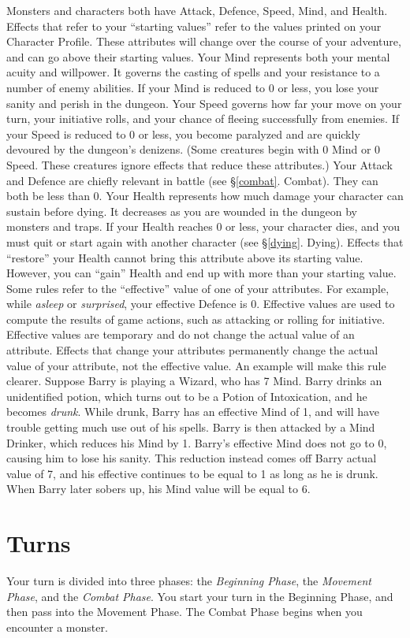 \documentclass{book}
\begin{document}
Monsters and characters both have Attack, Defence, Speed, Mind, and Health. Effects that refer to your “starting values” refer to the values printed on your Character Profile. These attributes will change over the course of your adventure, and can go above their starting values.
Your Mind represents both your mental acuity and willpower. It governs the casting of spells and your resistance to a number of enemy abilities. If your Mind is reduced to 0 or less, you lose your sanity and perish in the dungeon.
Your Speed governs how far your move on your turn, your initiative rolls, and your chance of fleeing successfully from enemies. If your Speed is reduced to 0 or less, you become paralyzed and are quickly devoured by the dungeon’s denizens. (Some creatures begin with 0 Mind or 0 Speed. These creatures ignore effects that reduce these attributes.)
Your Attack and Defence are chiefly relevant in battle (see §\ref{combat}. Combat). They can both be less than 0.
Your Health represents how much damage your character can sustain before dying. It decreases as you are wounded in the dungeon by monsters and traps. If your Health reaches 0 or less, your character dies, and you must quit or start again with another character (see §\ref{dying}. Dying). Effects that “restore” your Health cannot bring this attribute above its starting value. However, you can “gain” Health and end up with more than your starting value.
Some rules refer to the “effective” value of one of your attributes. For example, while \emph{asleep} or \emph{surprised}, your effective Defence is 0. Effective values are used to compute the results of game actions, such as attacking or rolling for initiative. Effective values are temporary and do not change the actual value of an attribute. Effects that change your attributes permanently change the actual value of your attribute, not the effective value.
An example will make this rule clearer. Suppose Barry is playing a Wizard, who has 7 Mind. Barry drinks an unidentified potion, which turns out to be a Potion of Intoxication, and he becomes \emph{drunk}. While drunk, Barry has an effective Mind of 1, and will have trouble getting much use out of his spells. Barry is then attacked by a Mind Drinker, which reduces his Mind by 1. Barry’s effective Mind does not go to 0, causing him to lose his sanity. This reduction instead comes off Barry actual value of 7, and his effective continues to be equal to 1 as long as he is drunk. When Barry later sobers up, his Mind value will be equal to 6.

\section{Turns}
Your turn is divided into three phases: the \emph{Beginning Phase}, the \emph{Movement Phase}, and the \emph{Combat Phase}. You start your turn in the Beginning Phase, and then pass into the Movement Phase. The Combat Phase begins when you encounter a monster.
\end{document}
